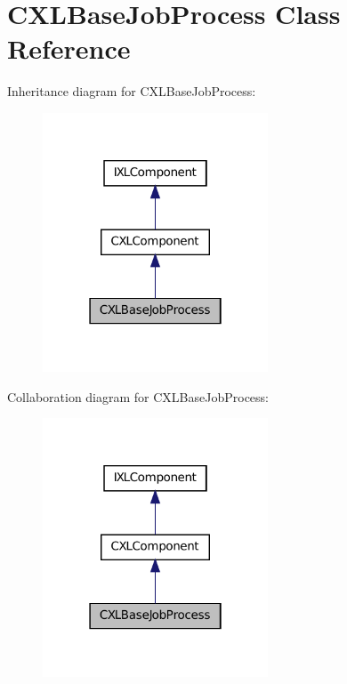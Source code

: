 \hypertarget{classCXLBaseJobProcess}{
\section{CXLBaseJobProcess Class Reference}
\label{classCXLBaseJobProcess}
}


Inheritance diagram for CXLBaseJobProcess:\nopagebreak
\begin{figure}[H]
\begin{center}
\leavevmode
\includegraphics[width=190pt]{classCXLBaseJobProcess__inherit__graph}
\end{center}
\end{figure}


Collaboration diagram for CXLBaseJobProcess:\nopagebreak
\begin{figure}[H]
\begin{center}
\leavevmode
\includegraphics[width=190pt]{classCXLBaseJobProcess__coll__graph}
\end{center}
\end{figure}
